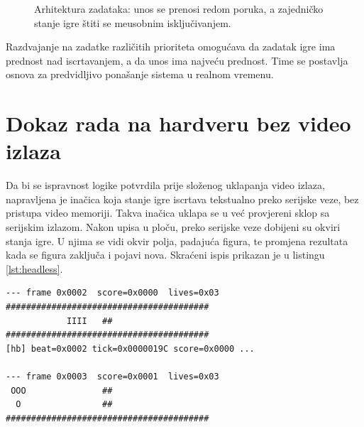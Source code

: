\begin{figure}[H]
\centering
{}
\caption{Arhitektura zadataka: unos se prenosi redom poruka, a zajedni\v{c}ko stanje igre \v{s}titi se me\dj{}usobnim isklju\v{c}ivanjem.}
\label{fig:zadaci}
\end{figure}

Razdvajanje na zadatke razli\v{c}itih prioriteta omogu\'cava da zadatak igre ima
prednost nad iscrtavanjem, a da unos ima najve\'cu prednost. Time se postavlja
osnova za predvidljivo pona\v{s}anje sistema u realnom vremenu.

\section{Dokaz rada na hardveru bez video izlaza}
\label{sec:zadaci-headless}

Da bi se ispravnost logike potvrdila prije slo\v{z}enog uklapanja video izlaza,
napravljena je ina\v{c}ica koja stanje igre iscrtava tekstualno preko serijske
veze, bez pristupa video memoriji. Takva ina\v{c}ica uklapa se u ve\'c provjereni
sklop sa serijskim izlazom. Nakon upisa u plo\v{c}u, preko serijske veze
dobijeni su okviri stanja igre. U njima se vidi okvir polja, padaju\'ca figura,
te promjena rezultata kada se figura zaklju\v{c}a i pojavi nova. Skra\'ceni
ispis prikazan je u listingu \ref{lst:headless}.

\begin{lstlisting}[caption={Skra\'ceni serijski ispis tekstualne ina\v{c}ice: rezultat raste sa 0x0000 na 0x0001 nakon zaklju\v{c}avanja figure.}, label={lst:headless}]
--- frame 0x0002  score=0x0000  lives=0x03
########################################
            IIII   ##
########################################
[hb] beat=0x0002 tick=0x0000019C score=0x0000 ...

--- frame 0x0003  score=0x0001  lives=0x03
 OOO               ##
  O                ##
########################################
\end{lstlisting}


